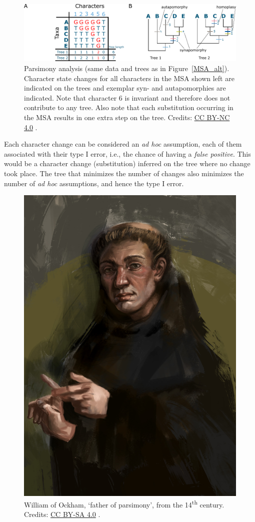 \begin{figure}[!htbp]
\centering
\includegraphics[width=1\linewidth]{files/parsimony-56aba4068172b94cd4b2bded1cd48e28.pdf}
\caption[]{Parsimony analysis (same data and trees as in Figure~\ref{MSA_alt}). Character state changes for all characters in the MSA shown left are indicated on the trees and exemplar syn- and autapomorphies are indicated.
Note that character 6 is invariant and therefore does not contribute to any tree. Also note that each substitution occurring in the MSA results in one extra step on the tree.
Credits: \href{https://creativecommons.org/licenses/by-nc/4.0/}{CC BY-NC 4.0} \cite{own_3_2024}.}
\label{parsimony}
\end{figure}

Each character change can be considered an \textit{ad hoc} assumption, each of them associated with their type I error, i.e., the chance of having a \textit{false positive}.
This would be a character change (substitution) inferred on the tree where no change took place.
The tree that minimizes the number of changes also minimizes the number of \textit{ad hoc} assumptions, and hence the type I error.

\begin{figure}[!htbp]
\centering
\includegraphics[width=0.3875\linewidth]{files/ockham-d211864d0d82ca1a7b5db5afff9fcc27.jpg}
\caption[]{William of Ockham, `father of parsimony', \newline
from the 14\textsuperscript{th} century. \newline
Credits: \href{https://creativecommons.org/licenses/by-sa/4.0/}{CC BY-SA 4.0} \cite{ockham_2022}.}
\label{ockham}
\end{figure}


